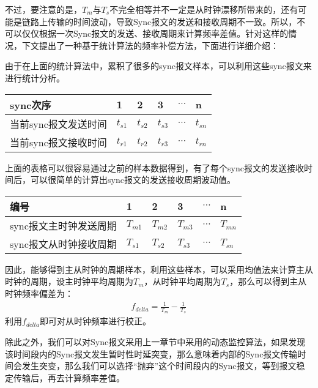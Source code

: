 不过，要注意的是，$T_{m}$与$T_{s}$不完全相等并不一定是从时钟漂移所带来的，还有可能是链路上传输的时间波动，导致Sync报文的发送和接收周期不一致。所以，不可以仅仅根据一次Sync报文的发送、接收周期来计算频率差值。针对这样的情况，下文提出了一种基于统计算法的频率补偿方法，下面进行详细介绍：

由于在上面的统计算法中，累积了很多的sync报文样本，可以利用这些sync报文来进行统计分析。
\begin{table}[htpb]
  \centering
  \begin{tabular}{llllll} \toprule
    sync次序 & 1 & 2 & 3 & $\cdots$ & n \\ \midrule
    当前sync报文发送时间 & $t_{s1}$ & $t_{s2}$ & $t_{s3}$ & $\cdots$ & $t_{sn}$ \\ \midrule
    当前sync报文接收时间 & $t_{r1}$ & $t_{r2}$ & $t_{r3}$ & $\cdots$ & $t_{rn}$  \\ \bottomrule
  \end{tabular}
\end{table}

上面的表格可以很容易通过之前的样本数据得到，有了每个sync报文的发送接收时间后，可以很简单的计算出sync报文的发送接收周期波动值。
\begin{table}[htpb]
  \centering
  \begin{tabular}{llllll} \toprule
    编号 & 1 & 2 & 3 & $\cdots$ & n \\ \midrule
    sync报文主时钟发送周期 & $T_{m1}$ & $T_{m2}$ & $T_{m3}$ & $\cdots$ & $T_{mn}$ \\ \midrule
    sync报文从时钟接收周期 & $T_{s1}$ & $T_{s2}$ & $T_{s3}$ & $\cdots$ & $T_{sn}$  \\ \bottomrule
  \end{tabular}
\end{table}

因此，能够得到主从时钟的周期样本，利用这些样本，可以采用均值法来计算主从时钟的周期，设主时钟平均周期为$T_{m}$，从时钟平均周期为$T_{s}$，那么可以得到主从时钟频率偏差为：
\begin {align}
f_{delta} = \frac{1}{T_{m}} - \frac{1}{T_{s}}
\end{align}
利用$f_{delta}$即可对从时钟频率进行校正。

除此之外，我们可以对Sync报文采用上一章节中采用的动态监控算法，如果发现该时间段内的Sync报文发生暂时性时延突变，那么意味着内部的Sync报文传输时间会发生突变，那么我们可以选择“抛弃”这个时间段内的Sync报文，等到报文稳定传输后，再去计算频率差值。

